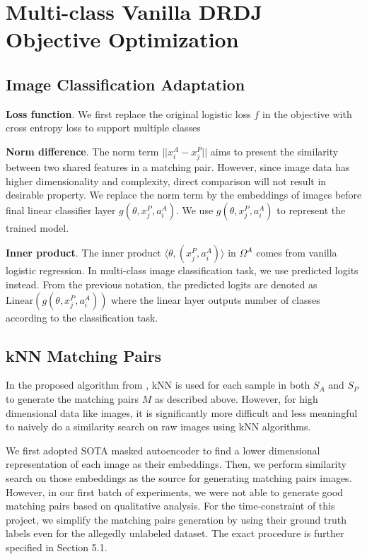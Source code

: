 \documentclass{article}
\begin{document}
\section{Multi-class Vanilla DRDJ Objective Optimization}
\subsection{Image Classification Adaptation}
\textbf{Loss function}. We first replace the original logistic loss $f$ in the objective with cross entropy loss 
to support multiple classes

\textbf{Norm difference}. The norm term $||x_i^A - x_j^P||$ aims to present the similarity between 
two shared features in a matching pair. However, since image data has higher dimensionality and complexity,
direct comparison will not result in desirable property. We replace the norm term by the embeddings of 
images before final linear classifier layer $g(\theta, x_j^P, a_i^A)$. We use $g(\theta, x_j^P, a_i^A)$ 
to represent the trained model.

\textbf{Inner product}. The inner product $\langle \theta, (x_j^P, a_i^A) \rangle$ in $\Omega^A$ comes from 
vanilla logistic regression. In multi-class image classification task, we use predicted logits instead. From 
the previous notation, the predicted logits are denoted as $\text{Linear}(g(\theta, x_j^P, a_i^A))$ where 
the linear layer outputs number of classes according to the classification task.

\subsection{kNN Matching Pairs}
In the proposed algorithm from \citep{awasthi2022distributionally}, kNN is used 
for each sample in both $S_A$ and $S_P$ to generate the matching pairs $M$ as described above. However, 
for high dimensional data like images, it is significantly more difficult and less meaningful to 
naively do a similarity search on raw images using kNN algorithms. 

We first adopted SOTA masked autoencoder \citep{he2022masked} to find a lower dimensional representation 
of each image as their embeddings. Then, we perform similarity search on those embeddings as the 
source for generating matching pairs images. However, in our first batch of experiments, we were not 
able to generate good matching pairs based on qualitative analysis. For the time-constraint of 
this project, we simplify the matching pairs generation by using their ground truth labels even 
for the allegedly unlabeled dataset. The exact procedure is further specified in Section 5.1.
\end{document}
